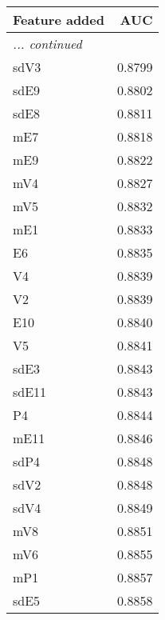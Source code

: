 {\begin{minipage}[t]{40mm}
\begin{tabularx}{40mm}{ l R }
Feature added & AUC \\\hline
{\itshape ... continued} \\
sdV3 & 0.8799 \\
sdE9 & 0.8802 \\
sdE8 & 0.8811 \\
mE7 & 0.8818 \\
mE9 & 0.8822 \\
mV4 & 0.8827 \\
mV5 & 0.8832 \\
mE1 & 0.8833 \\
E6 & 0.8835 \\
V4 & 0.8839 \\
V2 & 0.8839 \\
E10 & 0.8840 \\
V5 & 0.8841 \\
sdE3 & 0.8843 \\
sdE11 & 0.8843 \\
P4 & 0.8844 \\
mE11 & 0.8846 \\
sdP4 & 0.8848 \\
sdV2 & 0.8848 \\
sdV4 & 0.8849 \\
mV8 & 0.8851 \\
mV6 & 0.8855 \\
mP1 & 0.8857 \\
sdE5 & 0.8858 \\
\end{tabularx}
\end{minipage}
}
